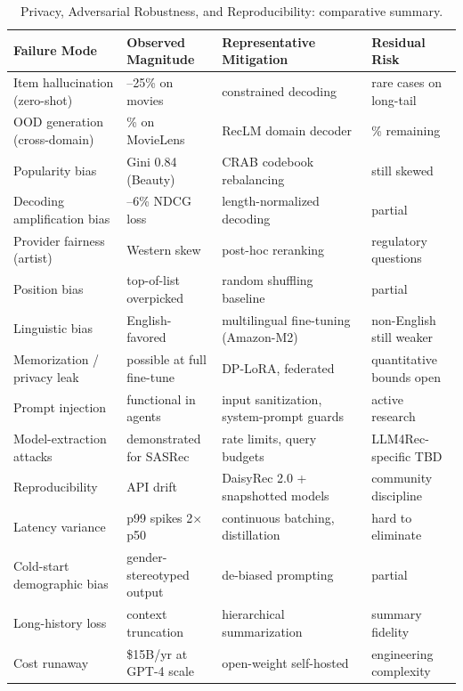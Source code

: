 \documentclass{article}
\begin{document}
\begin{table}[t]
\centering
\caption{Privacy, Adversarial Robustness, and Reproducibility: comparative summary.}
\label{tab:privacy-adversarial-robustness-and-reproducibility}
\begin{tabular}{>{\raggedright\arraybackslash}p{0.2500\linewidth}
  >{\raggedright\arraybackslash}p{0.2167\linewidth}
  >{\raggedright\arraybackslash}p{0.3333\linewidth}
  >{\raggedright\arraybackslash}p{0.2000\linewidth}}
\toprule
Failure Mode & Observed Magnitude & Representative Mitigation & Residual Risk \\
\midrule
Item hallucination (zero-shot) & 4--25\% on movies & constrained decoding & rare cases on long-tail \\
OOD generation (cross-domain) & 14\% on MovieLens & RecLM domain decoder & 1.7\% remaining \\
Popularity bias & Gini 0.84 (Beauty) & CRAB codebook rebalancing & 0.49 still skewed \\
Decoding amplification bias & 4--6\% NDCG loss & length-normalized decoding & partial \\
Provider fairness (artist) & Western skew & post-hoc reranking & regulatory questions \\
Position bias & top-of-list overpicked & random shuffling baseline & partial \\
Linguistic bias & English-favored & multilingual fine-tuning (Amazon-M2) & non-English still weaker \\
Memorization / privacy leak & possible at full fine-tune & DP-LoRA, federated & quantitative bounds open \\
Prompt injection & functional in agents & input sanitization, system-prompt guards & active research \\
Model-extraction attacks & demonstrated for SASRec & rate limits, query budgets & LLM4Rec-specific TBD \\
Reproducibility & API drift & DaisyRec 2.0 + snapshotted models & community discipline \\
Latency variance & p99 spikes 2× p50 & continuous batching, distillation & hard to eliminate \\
Cold-start demographic bias & gender-stereotyped output & de-biased prompting & partial \\
Long-history loss & context truncation & hierarchical summarization & summary fidelity \\
Cost runaway & \$15B/yr at GPT-4 scale & open-weight self-hosted & engineering complexity \\
\end{tabular}
\end{table}
\end{document}
